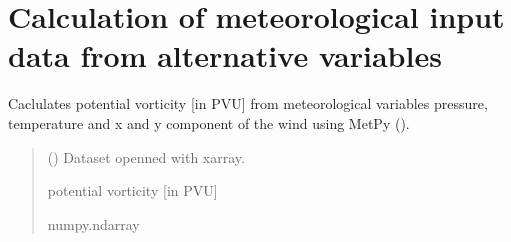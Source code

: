 \documentclass[a4paper,11pt,english]{sphinxmanual}
\begin{document}
\section{Calculation of meteorological input data from alternative variables}
\label{\detokenize{modules:module-climaccf.calc_altrv_vars}}\label{\detokenize{modules:calculation-of-meteorological-input-data-from-alternative-variables}}

\begin{fulllineitems}
\label{\detokenize{modules:climaccf.calc_altrv_vars.get_pvu}}
\pysigstartsignatures
{}
\pysigstopsignatures
\sphinxAtStartPar
Caclulates potential vorticity {[}in PVU{]} from meteorological variables pressure, temperature and x and y component of the wind using MetPy ().
\begin{quote}\begin{description}
\sphinxAtStartPar
{} () \textendash{} Dataset openned with xarray.

\sphinxAtStartPar
potential vorticity {[}in PVU{]}

\sphinxAtStartPar
numpy.ndarray

\end{description}\end{quote}

\end{fulllineitems}

\end{document}
